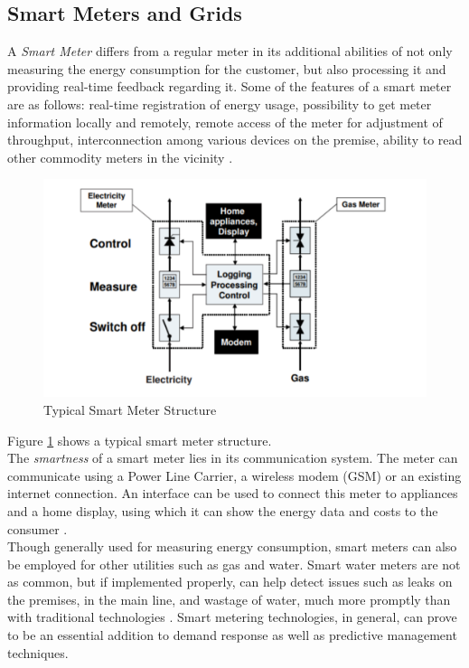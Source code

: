 \subsection{Smart Meters and Grids}
A {\em Smart Meter} differs from a regular meter in its additional abilities of not only measuring the energy consumption for the customer, but also processing it and providing real-time feedback regarding it. Some of the features of a smart meter are as follows:  real-time registration of energy usage, possibility to get meter information locally and remotely, remote access of the meter for adjustment of throughput, interconnection among various devices on the premise, ability to read other commodity meters in the vicinity \cite{leonardo05}.
\begin{figure}
	\includegraphics[width=1.0\columnwidth]{images/smart_meter.pdf}
	\caption{Typical Smart Meter Structure \cite{leonardo05}}
	\label{F:smart}
\end{figure}
Figure \ref{F:smart} shows a typical smart meter structure.\\
The {\em smartness} of a smart meter lies in its communication system. The meter can communicate using a Power Line Carrier, a wireless modem (GSM) or an existing internet connection. An interface can be used to connect this meter to appliances and a home display, using which it can show the energy data and costs to the consumer \cite{leonardo05}.\\
Though generally used for measuring energy consumption, smart meters can also be employed for other utilities such as gas and water. Smart water meters are not as common, but if implemented properly, can help detect issues such as leaks on the premises, in the main line, and wastage of water, much more promptly than with traditional technologies \cite{smartmeter09}. Smart metering technologies, in general, can prove to be an essential addition to demand response as well as predictive management techniques.\\
